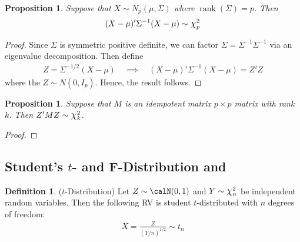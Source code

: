 \documentclass[12pt]{article}
\theoremstyle{plain}
\newtheorem{prop}[thm]{Proposition}
\theoremstyle{definition}
\newtheorem{defn}[thm]{Definition}
\theoremstyle{remark}
\newcommand*{\Chi}{\mbox{\large$\chi$}} %
\newcommand{\rank}{\operatorname{rank}}
\begin{document}
\clearpage
\begin{prop}
Suppose that $X\sim N_p(\mu,\Sigma)$ where $\rank(\Sigma)=p$. Then
\begin{align*}
  (X-\mu)'\Sigma^{-1}(X-\mu) \sim \Chi_p^2
\end{align*}
\end{prop}
\begin{proof}
Since $\Sigma$ is symmetric positive definite, we can factor
$\Sigma=\Sigma^{-1}\Sigma^{-1}$ via an eigenvalue decomposition. Then
define
\begin{align*}
  Z = \Sigma^{-1/2}(X-\mu)
  \quad\implies\quad
  (X-\mu)'\Sigma^{-1}(X-\mu)
  = Z'Z
\end{align*}
where the $Z\sim N(0,I_p)$. Hence, the result follows.
\end{proof}

\begin{prop}
Suppose that $M$ is an idempotent matrix $p\times p$ matrix with rank
$k$. Then $Z'MZ\sim \Chi^2_k$.
\end{prop}
\begin{proof}
\end{proof}

\clearpage
\subsection{Student's $t$- and F-Distribution and}

\begin{defn}($t$-Distribution)
Let $Z\sim \calN(0,1)$ and $Y\sim \Chi^2_n$ be independent random
variables. Then the following RV is student $t$-distributed with $n$
degrees of freedom:
\begin{align*}
  X = \frac{Z}{(Y/n)^{1/2}}
  \sim t_n
\end{align*}
\end{defn}
\end{document}
